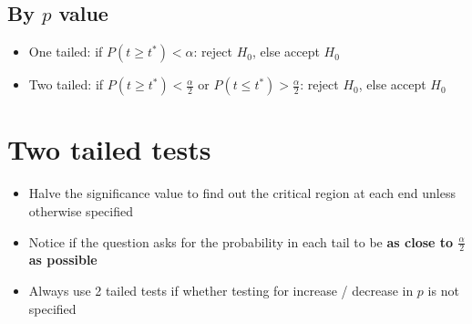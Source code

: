 \subsection{By $p$ value}
\begin{itemize}
    \item One tailed: if $P(t\geq t^*) < \alpha$: reject $H_0$, else accept $H_0$
    \item Two tailed: if $P(t\geq t^*) < \frac{\alpha}{2}$ or $P(t\leq t^*) > \frac{\alpha}{2}$: reject $H_0$, else accept $H_0$
\end{itemize}

\begin{comment}
\subsection{Presenting the solution}
\begin{enumerate}
    \item Define the test statistic, $X$ and the parameter, $p$
    \item Formulate a model for $X$ ($X \sim B(n, p)$)
    \item Write down $H_0$ and $H_1$ as statements involving $p$ (these determine whether your test is one or two-tailed)
    \item Specify the significance level
    \item Decide whether to reject $H_0$ by comparing $t^*$ to critical value or finding the probability of $t^*$ taking $x$ or a more extreme value
    \item State your conclusion: there is / is not sufficient evidence to reject $H_0$ + a statement \textbf{in the context of the question}
\end{enumerate}

\end{comment}


\section{Two tailed tests}
\begin{itemize}
    \item Halve the significance value to find out the critical region at each end unless otherwise specified
    \item Notice if the question asks for the probability in each tail to be \textbf{as close to $\frac{\alpha}{2}$ as possible}
    \item Always use 2 tailed tests if whether testing for increase / decrease in $p$ is not specified
\end{itemize}


